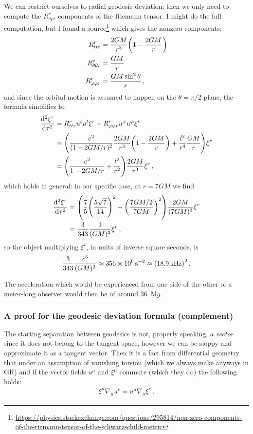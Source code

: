 \documentclass[main.tex]{subfiles}
\begin{document}
We can restrict ourselves to radial geodesic deviation: then we only need to compute the \(R^{r}_{\nu \rho r}\) components of the Riemann tensor. 
I might do the full computation, but I found a source\footnote{\url{https://physics.stackexchange.com/questions/295814/non-zero-components-of-the-riemann-tensor-of-the-schwarzschild-metric}} which gives the nonzero components: 
%
\begin{align}
  R^{r}_{ttr} &= \frac{2GM}{r^3} \qty(1 - \frac{2GM}{r}) \\
  R^{r}_{\theta \theta r} &= \frac{GM}{r} \\
  R^{r}_{\varphi \varphi r} &= \frac{G M \sin^2\theta}{r} 
\,,
\end{align}
%
and since the orbital motion is assumed to happen on the \(\theta = \pi /2\) plane, the formula simplifies to 
%
\begin{align}
  \dv[2]{\xi^{r}}{\tau } &= R^{r}_{ttr} u^{t} u^{t} \xi^{r} 
  + R^{r }_{\varphi \varphi r} u^{\varphi } u^{\varphi } \xi^{r}  \\
  &= \qty(\frac{e^2}{(1-2GM/r)^2} \frac{2GM}{r^{3}}\qty(1 - \frac{2GM}{r}) +  \frac{l^2}{r^{4}} \frac{GM}{r}) \xi^{r}  \\
  &= \qty(\frac{e^2}{1-2GM/r} + \frac{l^2}{r^2} ) \frac{2GM}{r^3} \xi^{r}
\,,
\end{align}
%
which holds in general: in our specific case, at \(r = 7GM \) we find 
%
\begin{align}
  \dv[2]{\xi^{r}}{\tau } &= \qty(\frac{7}{5} \qty(\frac{5 \sqrt{7}}{14})^2 + \qty(\frac{7GM/2}{7GM})^2 ) \frac{2GM}{(7GM)^3}  \xi^{r}  \\
  &= \frac{3}{343} \frac{1}{(GM)^2} \xi^{r}
\,,
\end{align}
%
so the object multiplying \(\xi^{r}\), in units of inverse square seconds, is 
%
\begin{align}
  \frac{3}{343} \frac{c^{6}}{(GM)^2} \approx \SI{356e6}{s^{-2}}
  \approx \qty(\SI{18.9}{kHz})^2
\,. 
\end{align}

The acceleration which would be experienced from one side of the other of a meter-long observer would then be of around \SI{36}{M}\(g\). 

\subsubsection{A proof for the geodesic deviation formula (complement)}

The starting separation between geodesics is not, properly speaking, a \emph{vector} since it does not belong to the tangent space, however we can be sloppy and approximate it as a tangent vector.
Then it is a fact from differential geometry that under an assumption of vanishing torsion (which we always make anyways in GR) and if the vector fields \(u^{\mu }\) and \(\xi^{\mu }\) commute (which they do) the following holds: 
%
\begin{align} \label{eq:lie-bracket-commutation}
  \xi^{\mu } \nabla_{\mu } u^{\nu } = u^{\mu } \nabla_{\mu } \xi^{\nu }
\,.
\end{align}
\end{document}
